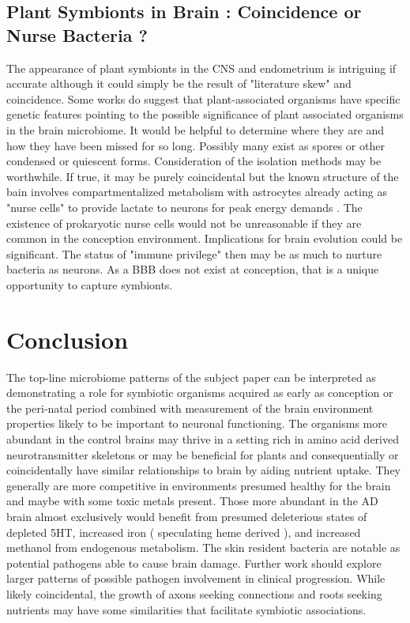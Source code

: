 \documentclass[aps,secnumarabic,balancelastpage,amsmath,amssymb,nofootinbib]{revtex4}
\begin{document}
\subsection{ Plant Symbionts in Brain : Coincidence or Nurse Bacteria ?  }


The appearance of plant symbionts in the CNS and endometrium 
 is intriguing if accurate although it could simply
be the result of "literature skew" and coincidence.
Some works do suggest that plant-associated organisms have
specific genetic features
\cite{Levy_Gonzalez_Mittelviefhaus_Genomic_features_bacterial_2018} 
pointing to the possible significance of plant associated
organisms in the brain microbiome.
It would be helpful
to determine where they are and how they have been
missed for so long. Possibly many exist as spores or 
other condensed or quiescent forms. Consideration of the
isolation methods may be worthwhile. If true, it may 
be purely coincidental but the known structure of the bain
involves compartmentalized metabolism with astrocytes
already acting as "nurse cells" to provide lactate
to neurons for peak energy demands
\cite{PMID12742077}. The existence of prokaryotic nurse
cells would not be unreasonable if they are common in 
the conception environment. Implications for brain
evolution could be significant.  
The status of "immune privilege" \cite{Proulx_Engelhardt_Central_nervous_system_zoning_2022}
 then may be as much to nurture bacteria as neurons.  
As a BBB  does not exist at conception,
that is a unique opportunity to capture symbionts. 





\section{Conclusion}
The top-line microbiome patterns of the subject paper 
\cite{10.3389/fcimb.2023.1123228} 
can be interpreted as demonstrating a role for symbiotic organisms
acquired as early as conception or the peri-natal period 
combined with  measurement of  the brain environment properties likely to be
important to neuronal functioning. 
The organisms more abundant
in the control brains 
may thrive in a setting rich in amino acid derived neurotransmitter
skeletons or 
may be beneficial for plants and consequentially
or coincidentally have similar relationships to brain 
by aiding nutrient uptake. They
generally are more competitive in environments presumed
healthy for the brain and maybe with some toxic metals present. 
Those more abundant in the AD brain almost exclusively 
would benefit from presumed deleterious states of 
depleted 5HT, increased iron ( speculating heme derived ),
and increased methanol from endogenous metabolism. 
The skin resident bacteria are  notable 
as potential pathogens able to cause brain damage.
Further work should explore larger patterns of possible pathogen
involvement in clinical progression.  
While likely coincidental,  the growth of axons
seeking connections and roots seeking nutrients 
may have some similarities that facilitate
symbiotic associations. 
\end{document}
